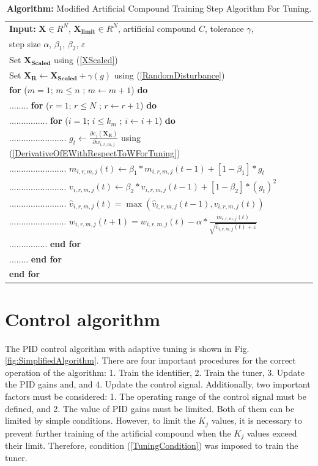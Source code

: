 \documentclass{ieeeaccess}
\begin{document}
\begin{table}[h]
 \centering
 \caption{\textbf{Algorithm:} Modified Artificial Compound Training Step Algorithm For Tuning.}\label{table:Training4}
 \begin{tabular}{l }
 \hline
 \textbf{Input:} \(\mathbf{X}\in R^N\), \(\mathbf{X_{limit}}\in R^N\), artificial compound \(C\), tolerance \(\gamma\),\\
 step size \(\alpha\), \(\beta_1\), \(\beta_2\), \(\varepsilon\)\\
 \hline
 Set \(\mathbf{X_{Scaled}}\) using (\ref{XScaled})\\
 Set \(\mathbf{X_R}\gets\mathbf{X_{Scaled}}+\gamma(g)\) using (\ref{RandomDisturbance}) \\
 \textbf{for} (\(m=1\); \( m\le n\) ; \(m\gets m+1\)) \textbf{do} \\
 ........ \textbf{for} (\(r=1\); \(r\le N\) ; \(r\gets r+1\)) \textbf{do} \\
 ................ \textbf{for} (\(i=1\); \(i\le k_m\) ; \(i\gets i+1\)) \textbf{do} \\
 ........................ \(g_t\gets\frac{\partial e_j(\mathbf{X_R})}{\partial w_{i,r,m,j}}\) using (\ref{DerivativeOfEWithRespectToWForTuning}) \\
 ........................ \(m_{i,r,m,j}(t)\gets\beta_1\ast m_{i,r,m,j}(t-1)+[1-\beta_1]\ast g_t\) \\
 ........................ \(v_{i,r,m,j}(t)\gets\beta_2\ast v_{i,r,m,j}(t-1)+[1-\beta_2]\ast(g_t)^2\) \\
 ........................ \({\hat{v}}_{i,r,m,j}(t)=\max{\left({\hat{v}}_{i,r,m,j}(t-1),v_{i,r,m,j}(t)\right)}\) \\
 ........................ \(w_{i,r,m,j}\left(t+1\right)=w_{i,r,m,j}\left(t\right)-\alpha\ast\frac{m_{i,r,m,j}\left(t\right)}{\sqrt{{\hat{v}}_{i,r,m,j}\left(t\right)+\varepsilon}}\) \\
 ................ \textbf{end for} \\
 ........ \textbf{end for} \\
 \textbf{end for} \\
 \hline
 \end{tabular}
\end{table}

\section{Control algorithm}
\label{sec:algorithm}

The PID control algorithm with adaptive tuning is shown in Fig.\ref{fig:SimplifiedAlgorithm}. There are four important procedures for the correct operation of the algorithm: 1. Train the identifier, 2. Train the tuner, 3. Update the PID gains and, and 4. Update the control signal. Additionally, two important factors must be considered: 1. The operating range of the control signal must be defined, and 2. The value of PID gains must be limited. Both of them can be limited by simple conditions. However, to limit the \(K_j\) values, it is necessary to prevent further training of the artificial compound when the \(K_j\) values exceed their limit. Therefore, condition (\ref{TuningCondition}) was imposed to train the tuner.
\end{document}
